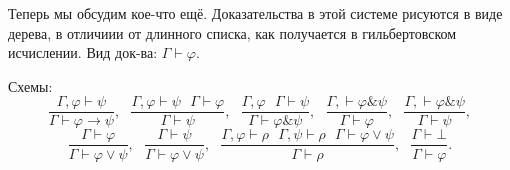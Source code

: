 Теперь мы обсудим кое-что ещё.
Доказательства в этой системе рисуются в виде дерева, в отличиии от длинного списка, как получается в гильбертовском исчислении.
Вид док-ва: $\Gamma \vdash \varphi$.

Схемы:
\[
    \dfrac{\Gamma, \varphi \vdash \psi}{\Gamma \vdash \varphi \to \psi},~~~
    \dfrac{\Gamma, \varphi \vdash \psi~~~ \Gamma \vdash \varphi}{\Gamma \vdash \psi},~~~
    \dfrac{\Gamma, \varphi ~~~ \Gamma \vdash \psi}{\Gamma \vdash \varphi \& \psi},~~~
    \dfrac{\Gamma, \vdash \varphi \& \psi}{\Gamma \vdash \varphi},~~~
    \dfrac{\Gamma, \vdash \varphi \& \psi}{\Gamma \vdash \psi},
\]\[
    \dfrac{\Gamma \vdash \varphi}{\Gamma\vdash\varphi \vee \psi},~~~
    \dfrac{\Gamma \vdash \psi}{\Gamma\vdash\varphi \vee \psi},~~~
    \dfrac{\Gamma, \varphi \vdash \rho~~~ \Gamma, \psi \vdash \rho~~~ \Gamma \vdash \varphi \vee \psi}{\Gamma\vdash\rho},~~~
    \dfrac{\Gamma \vdash \bot }{\Gamma\vdash\varphi}.
\]
\endinput